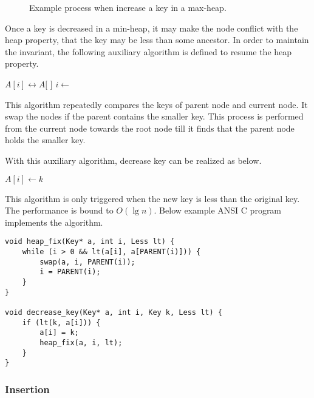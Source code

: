 \documentclass{article}
\begin{document}
\begin{figure}[htbp]
    \centering
    \caption{Example process when increase a key in a max-heap.} \label{fig:decrease-key-2}
\end{figure}

Once a key is decreased in a min-heap, it may make
the node conflict with the heap property, that the key may be less
than some ancestor. In order to maintain the
invariant, the following auxiliary algorithm is defined to resume the heap
property.

\begin{algorithmic}[1]
    \State {} $A[i] \leftrightarrow A[$  $]$
    \State $i \gets$  
  \EndWhile
\EndFunction
\end{algorithmic}

This algorithm repeatedly compares the keys of parent node and
current node. It swap the nodes if
the parent contains the smaller key. This process is performed
from the current node towards the root node till it finds that
the parent node holds the smaller key.

With this auxiliary algorithm, decrease key can be realized
as below.

\begin{algorithmic}[1]
    \State $A[i] \gets k$
    \State {}
  \EndIf
\EndFunction
\end{algorithmic}

This algorithm is only triggered when the new key
is less than the original key. The performance is bound to $O(\lg n)$.
Below example ANSI C program implements the algorithm.

\lstset{language=C}
\begin{lstlisting}
void heap_fix(Key* a, int i, Less lt) {
    while (i > 0 && lt(a[i], a[PARENT(i)])) {
        swap(a, i, PARENT(i));
        i = PARENT(i);
    }
}

void decrease_key(Key* a, int i, Key k, Less lt) {
    if (lt(k, a[i])) {
        a[i] = k;
        heap_fix(a, i, lt);
    }
}
\end{lstlisting}

\subsubsection{Insertion}
\end{document}
